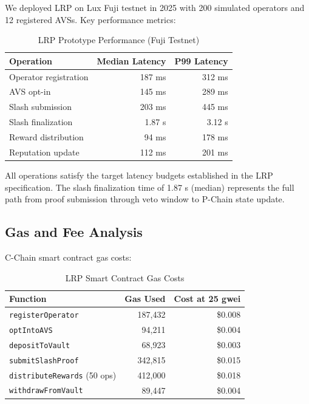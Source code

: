 We deployed LRP on Lux Fuji testnet in 2025 with 200 simulated operators and
12 registered AVSs. Key performance metrics:

\begin{table}[H]
\centering
\caption{LRP Prototype Performance (Fuji Testnet)}
\label{tab:perf}
\begin{tabular}{lrr}
\toprule
\textbf{Operation} & \textbf{Median Latency} & \textbf{P99 Latency} \\
\midrule
Operator registration & 187 ms & 312 ms \\
AVS opt-in & 145 ms & 289 ms \\
Slash submission & 203 ms & 445 ms \\
Slash finalization & 1.87 s & 3.12 s \\
Reward distribution & 94 ms & 178 ms \\
Reputation update & 112 ms & 201 ms \\
\bottomrule
\end{tabular}
\end{table}

All operations satisfy the target latency budgets established in the LRP specification.
The slash finalization time of 1.87 s (median) represents the full path from proof
submission through veto window to P-Chain state update.

\subsection{Gas and Fee Analysis}

C-Chain smart contract gas costs:

\begin{table}[H]
\centering
\caption{LRP Smart Contract Gas Costs}
\label{tab:gas}
\begin{tabular}{lrr}
\toprule
\textbf{Function} & \textbf{Gas Used} & \textbf{Cost at 25 gwei} \\
\midrule
\texttt{registerOperator} & 187,432 & \$0.008 \\
\texttt{optIntoAVS} & 94,211 & \$0.004 \\
\texttt{depositToVault} & 68,923 & \$0.003 \\
\texttt{submitSlashProof} & 342,815 & \$0.015 \\
\texttt{distributeRewards} (50 ops) & 412,000 & \$0.018 \\
\texttt{withdrawFromVault} & 89,447 & \$0.004 \\
\bottomrule
\end{tabular}
\end{table}

